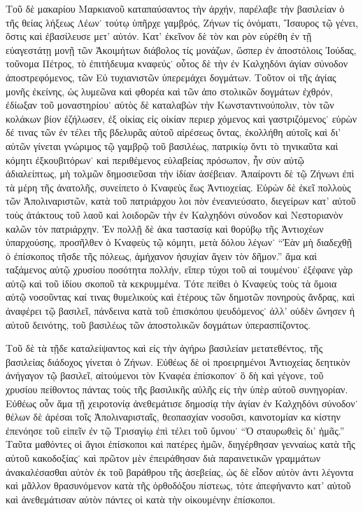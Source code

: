 Τοῦ δὲ μακαρίου Μαρκιανοῦ καταπαύσαντος τὴν ἀρχήν,
παρέλαβε τὴν βασιλείαν ὁ τῆς θείας λήξεως Λέων˙ τούτῳ
ὑπῆρχε γαμβρός, Ζήνων τίς ὀνόματι, Ἴσαυρος τῷ γένει,
ὅστις καὶ ἐβασίλευσε μετ’ αὐτόν. Κατ’ ἐκεῖνον δὲ τὸν και%
ρὸν εὑρέθη ἐν τῇ εὐαγεστάτῃ μονῇ τῶν Ἀκοιμήτων
διάβολος τίς μονάζων, ὥσπερ ἐν ἀποστόλοις Ἰούδας,
τοὔνομα Πέτρος, τὸ ἐπιτήδευμα κναφεύς˙ οὗτος δὲ τὴν
ἐν Καλχηδόνι ἁγίαν σύνοδον ἀποστρεφόμενος, τῶν Εὐ%
τυχιανιστῶν ὑπερεμάχει δογμάτων. Τοῦτον οἱ τῆς ἁγίας
μονῆς ἐκείνης, ὡς λυμεῶνα καὶ φθορέα καὶ τῶν ἀπο%
στολικῶν δογμάτων ἐχθρόν, ἐδίωξαν τοῦ μοναστηρίου˙
αὐτὸς δὲ καταλαβὼν τὴν Κωνσταντινούπολιν, τὸν τῶν
κολάκων βίον ἐζήλωσεν, ἐξ οἰκίας εἰς οἰκίαν περιερ%
χόμενος καὶ γαστριζόμενος˙ εὑρὼν δέ τινας τῶν ἐν τέλει
τῆς βδελυρᾶς αὐτοῦ αἱρέσεως ὄντας, ἐκολλήθη αὐτοῖς
καὶ δι’ αὐτῶν γίνεται γνώριμος τῷ γαμβρῷ τοῦ βασιλέως,
πατρικίῳ ὄντι τὸ τηνικαῦτα καὶ κόμητι ἐξκουβιτόρων˙
καὶ περιθέμενος εὐλαβείας πρόσωπον, ἦν σὺν αὐτῷ
ἀδιαλείπτως, μὴ τολμῶν δημοσιεῦσαι τὴν ἰδίαν ἀσέβειαν.
Ἀπαίροντι δὲ τῷ Ζήνωνι ἐπὶ τὰ μέρη τῆς ἀνατολῆς,
συνείπετο ὁ Κναφεὺς ἕως Ἀντιοχείας. Εὑρὼν δὲ ἐκεῖ
πολλοὺς τῶν Ἀπολιναριστῶν, κατὰ τοῦ πατριάρχου λοι%
πὸν ἐνεανιεύσατο, διεγείρων κατ’ αὐτοῦ τοὺς ἀτάκτους
τοῦ λαοῦ καὶ λοιδορῶν τὴν ἐν Καλχηδόνι σύνοδον καὶ
Νεστοριανὸν καλῶν τὸν πατριάρχην. Ἐν πολλῇ δὲ ἀκα%
ταστασίᾳ καὶ θορύβῳ τῆς Ἀντιοχέων ὑπαρχούσης,
προσῆλθεν ὁ Κναφεὺς τῷ κόμητι, μετὰ δόλου λέγων˙
\enquote{Ἐὰν μὴ διαδεχθῇ ὁ ἐπίσκοπος τῆσδε τῆς πόλεως,
ἀμήχανον ἡσυχίαν ἄγειν τὸν δῆμον.} ἅμα καὶ ταξάμενος
αὐτῷ χρυσίου ποσότητα πολλήν, εἴπερ τύχοι τοῦ αἰ%
τουμένου˙ ἐξέφανε γὰρ αὐτῷ καὶ τοῦ ἰδίου σκοποῦ τὰ
κεκρυμμένα. Τότε πείθει ὁ Κναφεὺς τοὺς τὰ ὅμοια
αὐτῷ νοσοῦντας καί τινας θυμελικοὺς καὶ ἑτέρους τῶν
δημοτῶν πονηροὺς ἄνδρας, καὶ ἀναφέρει τῷ βασιλεῖ,
πάνδεινα κατὰ τοῦ ἐπισκόπου ψευδόμενος˙ ἀλλ’ οὐδὲν
ὤνησεν ἡ αὐτοῦ δεινότης, τοῦ βασιλέως τῶν ἀποστολικῶν
δογμάτων ὑπερασπίζοντος.

Τοῦ δὲ τὰ τῇδε καταλείψαντος καὶ εἰς τὴν ἀγήρω
βασιλείαν μετατεθέντος, τῆς βασιλείας διάδοχος γίνεται
ὁ Ζήνων. Εὐθέως δὲ οἱ προειρημένοι Ἀντιοχείας δεητικὸν
ἀνήγαγον τῷ βασιλεῖ, αἰτούμενοι τὸν Κναφέα ἐπίσκοπον˙
ὃ δὴ καὶ γέγονε, τοῦ χρυσίου πείθοντος πάντας τοὺς
τῆς βασιλικῆς αὐλῆς εἰς τὴν ὑπὲρ αὐτοῦ συνηγορίαν.
Εὐθέως οὖν ἅμα τῇ χειροτονίᾳ ἀνεθεμάτισε δημοσίᾳ τὴν
ἁγίαν ἐν Καλχηδόνι σύνοδον˙ θέλων δὲ ἀρέσαι τοῖς
Ἀπολιναρισταῖς, θεοπασχίαν νοσοῦσι, καινοτομίαν κα%
κίστην ἐπενόησε τοῦ εἰπεῖν ἐν τῷ Τρισαγίῳ ἐπὶ τέλει
τοῦ ὕμνου˙ \enquote{Ὁ σταυρωθεὶς δι’ ἡμᾶς.} Ταῦτα μαθόντες οἱ
ἅγιοι ἐπίσκοποι καὶ πατέρες ἡμῶν, διηγέρθησαν γενναίως
κατὰ τῆς αὐτοῦ κακοδοξίας˙ καὶ πρῶτον μὲν ἐπειράθησαν
διὰ παραινετικῶν γραμμάτων ἀνακαλέσασθαι αὐτὸν ἐκ
τοῦ βαράθρου τῆς ἀσεβείας, ὡς δὲ εἶδον αὐτὸν ἀντι%
λέγοντα καὶ μᾶλλον θρασυνόμενον κατὰ τῆς ὀρθοδόξου
πίστεως, τότε ἀπεφήναντο κατ’ αὐτοῦ καὶ ἀνεθεμάτισαν
αὐτὸν πάντες οἱ κατὰ τὴν οἰκουμένην ἐπίσκοποι.

